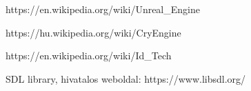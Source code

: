 \begin{thebibliography}{x}

https://en.wikipedia.org/wiki/Unreal\_Engine

https://hu.wikipedia.org/wiki/CryEngine

https://en.wikipedia.org/wiki/Id\_Tech

SDL library, hivatalos weboldal: https://www.libsdl.org/

\end{thebibliography}

